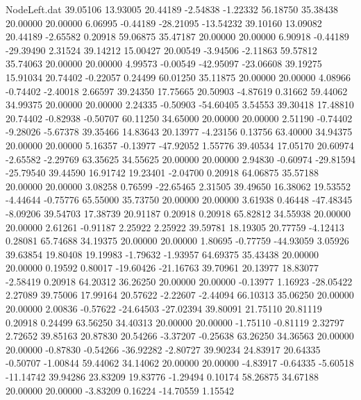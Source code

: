 \begin{filecontents}{NodeLeft.dat}
  39.05106   13.93005   20.44189    -2.54838   -1.22332   56.18750   35.38438   20.00000   20.00000    6.06995   -0.44189  -28.21095  -13.54232
  39.10160   13.09082   20.44189    -2.65582    0.20918   59.06875   35.47187   20.00000   20.00000    6.90918   -0.44189  -29.39490    2.31524
  39.14212   15.00427   20.00549    -3.94506   -2.11863   59.57812   35.74063   20.00000   20.00000    4.99573   -0.00549  -42.95097  -23.06608
  39.19275   15.91034   20.74402    -0.22057    0.24499   60.01250   35.11875   20.00000   20.00000    4.08966   -0.74402   -2.40018    2.66597
  39.24350   17.75665   20.50903    -4.87619    0.31662   59.44062   34.99375   20.00000   20.00000    2.24335   -0.50903  -54.60405    3.54553
  39.30418   17.48810   20.74402    -0.82938   -0.50707   60.11250   34.65000   20.00000   20.00000    2.51190   -0.74402   -9.28026   -5.67378
  39.35466   14.83643   20.13977    -4.23156    0.13756   63.40000   34.94375   20.00000   20.00000    5.16357   -0.13977  -47.92052    1.55776
  39.40534   17.05170   20.60974    -2.65582   -2.29769   63.35625   34.55625   20.00000   20.00000    2.94830   -0.60974  -29.81594  -25.79540
  39.44590   16.91742   19.23401    -2.04700    0.20918   64.06875   35.57188   20.00000   20.00000    3.08258    0.76599  -22.65465    2.31505
  39.49650   16.38062   19.53552    -4.44644   -0.75776   65.55000   35.73750   20.00000   20.00000    3.61938    0.46448  -47.48345   -8.09206
  39.54703   17.38739   20.91187     0.20918    0.20918   65.82812   34.55938   20.00000   20.00000    2.61261   -0.91187    2.25922    2.25922
  39.59781   18.19305   20.77759    -4.12413    0.28081   65.74688   34.19375   20.00000   20.00000    1.80695   -0.77759  -44.93059    3.05926
  39.63854   19.80408   19.19983    -1.79632   -1.93957   64.69375   35.43438   20.00000   20.00000    0.19592    0.80017  -19.60426  -21.16763
  39.70961   20.13977   18.83077    -2.58419    0.20918   64.20312   36.26250   20.00000   20.00000   -0.13977    1.16923  -28.05422    2.27089
  39.75006   17.99164   20.57622    -2.22607   -2.44094   66.10313   35.06250   20.00000   20.00000    2.00836   -0.57622  -24.64503  -27.02394
  39.80091   21.75110   20.81119     0.20918    0.24499   63.56250   34.40313   20.00000   20.00000   -1.75110   -0.81119    2.32797    2.72652
  39.85163   20.87830   20.54266    -3.37207   -0.25638   63.26250   34.36563   20.00000   20.00000   -0.87830   -0.54266  -36.92282   -2.80727
  39.90234   24.83917   20.64335    -0.50707   -1.00844   59.44062   34.14062   20.00000   20.00000   -4.83917   -0.64335   -5.60518  -11.14742
  39.94286   23.83209   19.83776    -1.29494    0.10174   58.26875   34.67188   20.00000   20.00000   -3.83209    0.16224  -14.70559    1.15542

\end{filecontents}

